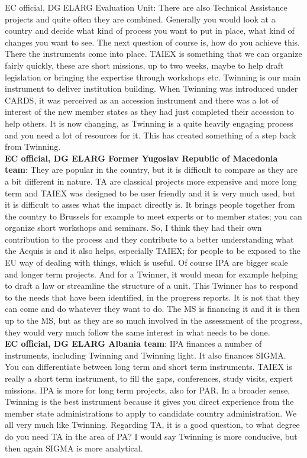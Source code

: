 EC official, DG ELARG Evaluation Unit: There are also Technical Assistance projects and quite often they are combined. Generally you would look at a country and decide what kind of process you want to put in place, what kind of changes you want to see. The next question of course is, how do you achieve this. There the instruments come into place. TAIEX is something that we can organize fairly quickly, these are short missions, up to two weeks, maybe to help draft legislation or bringing the expertise through workshops etc. Twinning is our main instrument to deliver institution building. When Twinning was introduced under CARDS, it was perceived as an accession instrument and there was a lot of interest of the new member states as they had just completed their accession to help others. It is now changing, as Twinning is a quite heavily engaging process and you need a lot of resources for it. This has created something of a step back from Twinning.\\ 
\textbf{EC official, DG ELARG Former Yugoslav Republic of Macedonia team}: They are popular in the country, but it is difficult to compare as they are a bit different in nature. TA are classical projects more expensive and more long term and TAIEX was designed to be user friendly and it is very much used, but it is difficult to asses what the impact directly is. It brings people together from the country to Brussels for example to meet experts or to member states; you can organize short workshops and seminars. So, I think they had their own contribution to the process and they contribute to a better understanding what the Acquis is and it also helps, especially TAIEX; for people to be exposed to the EU way of dealing with things, which is useful. Of course IPA are bigger scale and longer term projects. And for a Twinner, it would mean for example helping to draft a law or streamline the structure of a unit. This Twinner has to respond to the needs that have been identified, in the progress reports. It is not that they can come and do whatever they want to do. The MS is financing it and it is then up to the MS, but as they are so much involved in the assessment of the progress, they would very much follow the same interest in what needs to be done.  \\
\textbf{EC official, DG ELARG Albania team}: IPA finances a number of instruments, including Twinning and Twinning light. It also finances SIGMA. You can differentiate between long term and short term instruments. TAIEX is really a short term instrument, to fill the gaps, conferences, study visits, expert missions. IPA is more for long term projects, also for PAR. In a broader sense, Twinning is the best instrument because it gives you direct experience from the member state administrations to apply to candidate country administration. We all very much like Twinning. Regarding TA, it is a good question, to what degree do you need TA in the area of PA? I would say Twinning is more conducive, but then again SIGMA is more analytical.\\
